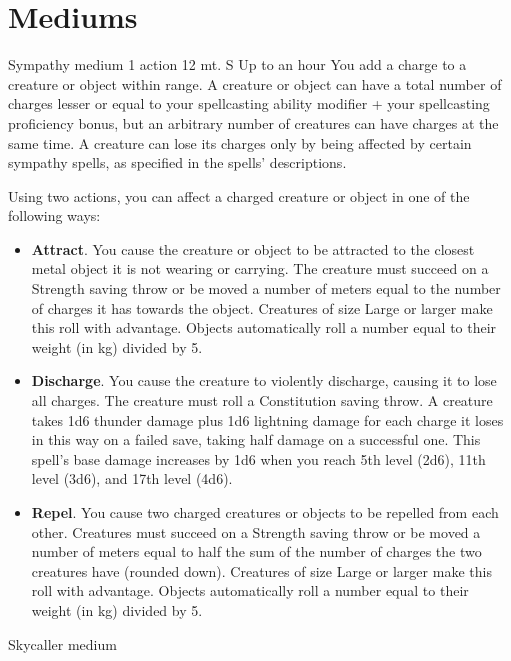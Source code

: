 \section{Mediums} \label{sec::mediums}
    {Sympathy medium}
    {1 action}
    {12 mt.}
    {S}
    {Up to an hour}
    You add a charge to a creature or object within range.
    A creature or object can have a total number of charges lesser or equal to your spellcasting ability modifier + your spellcasting proficiency bonus, but an arbitrary number of creatures can have charges at the same time.
    A creature can lose its charges only by being affected by certain sympathy spells, as specified in the spells' descriptions.

    Using two actions, you can affect a charged creature or object in one of the following ways:
    \begin{itemize}
        \item \textbf{Attract}.
        You cause the creature or object to be attracted to the closest metal object it is not wearing or carrying.
        The creature must succeed on a Strength saving throw or be moved a number of meters equal to the number of charges it has towards the object.
        Creatures of size Large or larger make this roll with advantage.
        Objects automatically roll a number equal to their weight (in kg) divided by 5.
        \item \textbf{Discharge}.
        You cause the creature to violently discharge, causing it to lose all charges.
        The creature must roll a Constitution saving throw.
        A creature takes 1d6 thunder damage plus 1d6 lightning damage for each charge it loses in this way on a failed save, taking half damage on a successful one.
        This spell's base damage increases by 1d6 when you reach 5th level (2d6), 11th level (3d6), and 17th level (4d6).
        \item \textbf{Repel}.
        You cause two charged creatures or objects to be repelled from each other.
        Creatures must succeed on a Strength saving throw or be moved a number of meters equal to half the sum of the number of charges the two creatures have (rounded down).
        Creatures of size Large or larger make this roll with advantage.
        Objects automatically roll a number equal to their weight (in kg) divided by 5.
    \end{itemize}
    {Skycaller medium}
